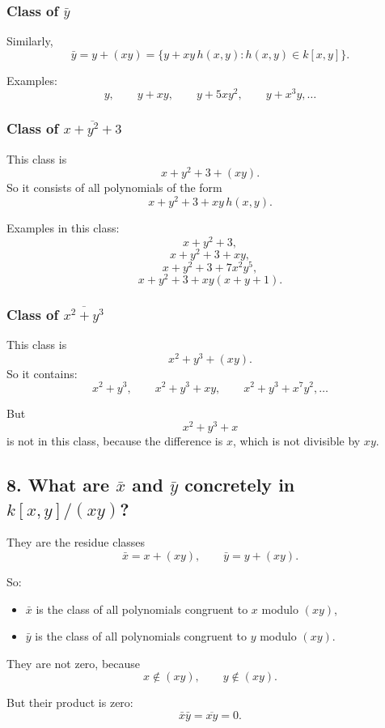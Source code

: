 \documentclass[12pt,a4paper,oneside]{report}
\theoremstyle{notespace}
\begin{document}
	\subsubsection{Class of \(\bar y\)}
	
	Similarly,
	\[
	\bar y=y+(xy)=\{y+xy\,h(x,y):h(x,y)\in k[x,y]\}.
	\]
	
	Examples:
	\[
	y,\qquad y+xy,\qquad y+5xy^2,\qquad y+x^3y,\dots
	\]
	
	\subsubsection{Class of \(\overline{x+y^2+3}\)}
	
	This class is
	\[
	x+y^2+3+(xy).
	\]
	So it consists of all polynomials of the form
	\[
	x+y^2+3+xy\,h(x,y).
	\]
	
	Examples in this class:
	\[
	x+y^2+3,
	\]
	\[
	x+y^2+3+xy,
	\]
	\[
	x+y^2+3+7x^2y^5,
	\]
	\[
	x+y^2+3+xy(x+y+1).
	\]
	
	\subsubsection{Class of \(\overline{x^2+y^3}\)}
	
	This class is
	\[
	x^2+y^3+(xy).
	\]
	So it contains:
	\[
	x^2+y^3,\qquad x^2+y^3+xy,\qquad x^2+y^3+x^7y^2,\dots
	\]
	
	But
	\[
	x^2+y^3+x
	\]
	is not in this class, because the difference is \(x\), which is not divisible by \(xy\).
	
	\subsection{8. What are \(\bar x\) and \(\bar y\) concretely in \(k[x,y]/(xy)\)?}
	
	They are the residue classes
	\[
	\bar x=x+(xy),\qquad \bar y=y+(xy).
	\]
	
	So:
	\begin{itemize}
		\item \(\bar x\) is the class of all polynomials congruent to \(x\) modulo \((xy)\),
		\item \(\bar y\) is the class of all polynomials congruent to \(y\) modulo \((xy)\).
	\end{itemize}
	
	They are not zero, because
	\[
	x\notin (xy),\qquad y\notin (xy).
	\]
	
	But their product is zero:
	\[
	\bar x\bar y=\overline{xy}=0.
	\]
	
\end{document}
